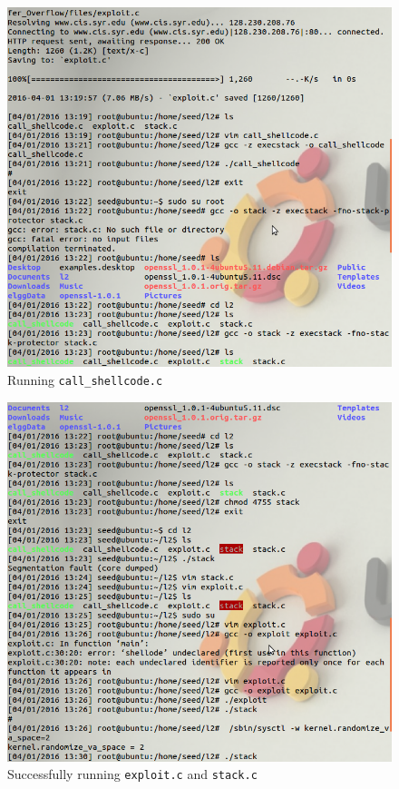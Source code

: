 \documentclass{article}
\begin{document}
  \begin{figure}
    \centering
    \includegraphics[width=\textwidth]{ss/2.png}
    \caption{Running {\tt call\_shellcode.c}}
  \end{figure}

  \begin{figure}
    \centering
    \includegraphics[width=\textwidth]{ss/3.png}
    \caption{Successfully running {\tt exploit.c} and {\tt stack.c}}
  \end{figure}
\end{document}
